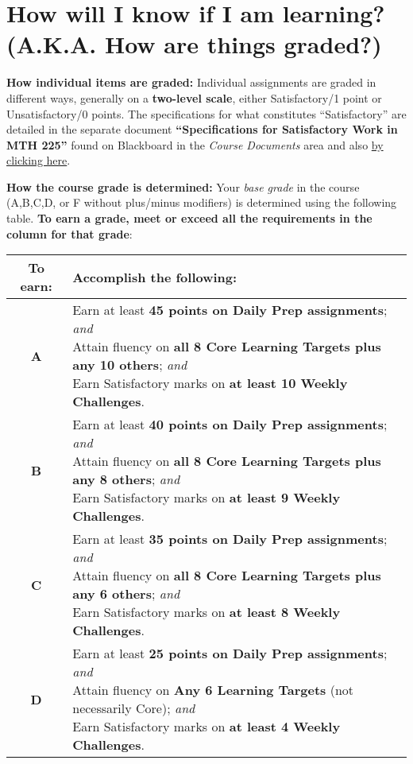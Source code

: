 \documentclass[]{article}
\begin{document}
\section{How will I know if I am learning? (A.K.A. How are things graded?)}

\textbf{How individual items are graded:} Individual assignments are graded in different ways, generally on a \textbf{two-level scale}, either Satisfactory/1 point or Unsatisfactory/0 points. The specifications for what constitutes ``Satisfactory'' are detailed in the separate document \textbf{``Specifications for Satisfactory Work in MTH 225''} found on Blackboard in the \textit{Course Documents} area and also \href{https://hackmd.io/@rtalbert235/SyVUNKrkt}{by clicking here}.
 

\textbf{How the course grade is determined:} Your \textit{base grade} in the course (A,B,C,D, or F without plus/minus modifiers) is determined using the following table. \textbf{To earn a grade, meet or exceed all the requirements in the column for that grade}: 

\begin{center}
    \begin{tabular}{c|l}
 To earn: & Accomplish the following: \\ \hline \hline
 \textbf{A} & \makecell[l]{Earn at least \textbf{45 points on Daily Prep assignments};
\emph{and} \\ Attain fluency on \textbf{all 8 Core Learning Targets plus any 10 others}; \emph{and} \\ Earn Satisfactory marks on \textbf{at least 10 Weekly Challenges}.} \\ \hline 
 \textbf{B} & \makecell[l]{Earn at least \textbf{40 points on Daily Prep assignments};
\emph{and} \\ Attain fluency on \textbf{all 8 Core Learning Targets plus any 8 others}; \emph{and} \\ Earn Satisfactory marks on \textbf{at least 9 Weekly Challenges}.} \\ \hline 
 \textbf{C} & \makecell[l]{Earn at least \textbf{35 points on Daily Prep assignments};
\emph{and} \\ Attain fluency on \textbf{all 8 Core Learning Targets plus any 6 others}; \emph{and} \\ Earn Satisfactory marks on \textbf{at least 8 Weekly Challenges}.} \\ \hline 
 \textbf{D} & \makecell[l]{Earn at least \textbf{25 points on Daily Prep assignments};
\emph{and} \\ Attain fluency on \textbf{Any 6 Learning Targets} (not necessarily Core); \emph{and} \\ Earn Satisfactory marks on \textbf{at least 4 Weekly Challenges}.} \\ \hline 
\end{tabular}
\end{center}
\end{document}
